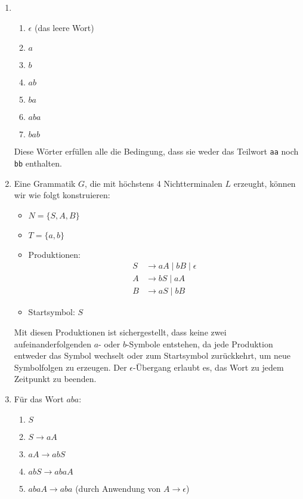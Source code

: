 \documentclass{uebungsblatt}
\begin{document}
\begin{loesung}
	\begin{enumerate}

		\item
		      \begin{enumerate}
			      \item $\epsilon$ (das leere Wort)
			      \item $a$
			      \item $b$
			      \item $ab$
			      \item $ba$
			      \item $aba$
			      \item $bab$
		      \end{enumerate}

		      Diese Wörter erfüllen alle die Bedingung, dass sie weder das Teilwort \texttt{aa} noch \texttt{bb} enthalten.


		\item
		      Eine Grammatik $G$, die mit höchstens 4 Nichtterminalen $L$ erzeught, können wir wie folgt konstruieren:

		      \begin{itemize}
			      \item $N = \{S, A, B\}$
			      \item $T = \{a, b\}$
			      \item Produktionen:
			            \begin{align*}
				            S & \rightarrow aA \mid bB \mid \epsilon \\
				            A & \rightarrow bS \mid aA               \\
				            B & \rightarrow aS \mid bB
			            \end{align*}
			      \item Startsymbol: $S$
		      \end{itemize}

		      Mit diesen Produktionen ist sichergestellt, dass keine zwei aufeinanderfolgenden $a$- oder $b$-Symbole entstehen, da jede Produktion entweder das Symbol wechselt oder zum Startsymbol zurückkehrt, um neue Symbolfolgen zu erzeugen. Der $\epsilon$-Übergang erlaubt es, das Wort zu jedem Zeitpunkt zu beenden.


		      \label{gra}
		\item
		      Für das Wort $aba$:

		      \begin{enumerate}
			      \item $S$
			      \item $S \rightarrow aA$
			      \item $aA \rightarrow abS$
			      \item $abS \rightarrow abaA$
			      \item $abaA \rightarrow aba$ (durch Anwendung von $A \rightarrow \epsilon$)
		      \end{enumerate}


\end{enumerate}
\end{loesung}
\end{document}
